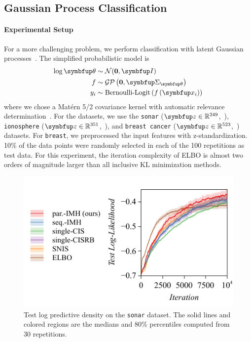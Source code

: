   \vspace{-0.05in}
\subsection{Gaussian Process Classification}\label{section:bgp}
  \vspace{-0.05in}
\paragraph{Experimental Setup}
For a more challenging problem, we perform classification with latent Gaussian processes~\citep{rasmussen_gaussian_2006, NIPS2014_8c6744c9}.
The simplified probabilistic model is
\begin{align*}
  \log \vtheta &\sim \mathcal{N}(\mathbf{0}, \mI) \\
   f &\sim \mathcal{GP}\left(\mathbf{0}, \mSigma_{\vtheta}\right) \\
   y_i &\sim \text{Bernoulli-Logit}\left(  f\left( \vx_i \right) \right)
\end{align*}
where we chose a Mat\'ern 5/2 covariance kernel with automatic relevance determination~\citep{neal_bayesian_1996}.
For the datasets, we use the \texttt{sonar} (\(\vz \in \mathbb{R}^{249}\),~\citealt{gorman_analysis_1988}), \texttt{ionosphere} (\(\vz \in \mathbb{R}^{351}\),~\citealt{Sigillito1989ClassificationOR}), and \texttt{breast cancer} (\(\vz \in \mathbb{R}^{523}\),~\citealt{wolberg_multisurface_1990}) datasets.
For \texttt{breast}, we preprocessed the input features with z-standardization.
10\% of the data points were randomly selected in each of the 100 repetitions as test data.
For this experiment, the iteration complexity of ELBO is almost two orders of magnitude larger than all inclusive KL minimization methods.

%
\begin{figure}[H]
  \centering
     \includegraphics[scale=0.8]{figures/sonar_01.pdf}
  \caption{Test log predictive density on the \texttt{sonar} dataset.
    The solid lines and colored regions are the medians and 80\% percentiles computed from 30 repetitions.
  }\label{fig:gp}
\end{figure}
%
\vspace{-0.05in}
